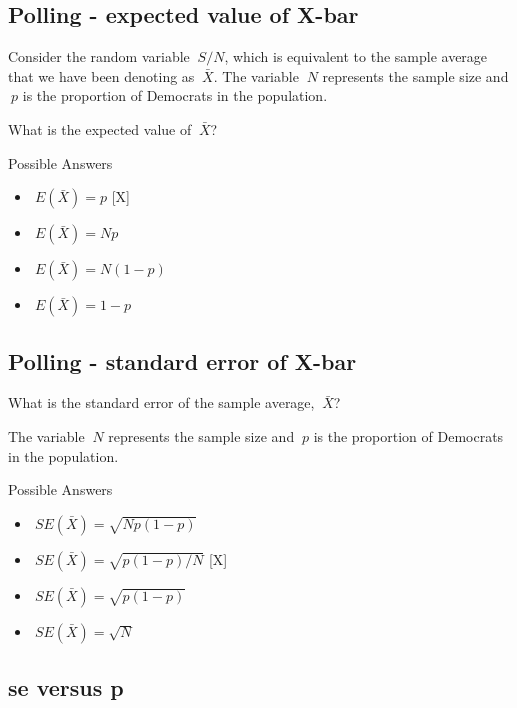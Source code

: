\documentclass[]{article}
\providecommand{\tightlist}{%
  \setlength{\itemsep}{0pt}\setlength{\parskip}{0pt}}
\begin{document}
\subsection{\texorpdfstring{\textbf{Polling - expected value of
X-bar}}{Polling - expected value of X-bar}}\label{polling---expected-value-of-x-bar}

Consider the random variable \(\ S/N\), which is equivalent to the
sample average that we have been denoting as \(\ \bar{X}\). The variable
\(\ N\) represents the sample size and \(\ p\) is the proportion of
Democrats in the population.

What is the expected value of \(\ \bar{X}\)?

Possible Answers

\begin{itemize}
\tightlist
\item
  \(\ E(\bar{X})=p\) {[}X{]}
\item
  \(\ E(\bar{X})=Np\)
\item
  \(\ E(\bar{X})=N(1−p)\)
\item
  \(\ E(\bar{X})=1−p\)
\end{itemize}

\subsection{\texorpdfstring{\textbf{Polling - standard error of
X-bar}}{Polling - standard error of X-bar}}\label{polling---standard-error-of-x-bar}

What is the standard error of the sample average, \(\ \bar{X}\)?

The variable \(\ N\) represents the sample size and \(\ p\) is the
proportion of Democrats in the population.

Possible Answers

\begin{itemize}
\tightlist
\item
  \(\ SE(\bar{X})=\sqrt{Np(1−p)}\)
\item
  \(\ SE(\bar{X})=\sqrt{p(1−p)/N}\) {[}X{]}
\item
  \(\ SE(\bar{X})=\sqrt{p(1−p)}\)
\item
  \(\ SE(\bar{X})=\sqrt{N}\)
\end{itemize}

\subsection{\texorpdfstring{\textbf{se versus
p}}{se versus p}}\label{se-versus-p}
\end{document}
